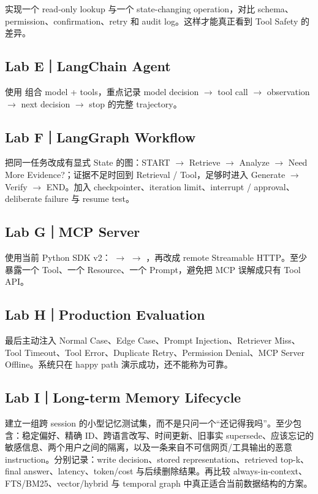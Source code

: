 \documentclass[profile=standard,twoside=false]{ipara-handbook}
\begin{document}
实现一个 read-only lookup 与一个 state-changing operation，对比 schema、permission、confirmation、retry 和 audit log。这样才能真正看到 Tool Safety 的差异。

\subsection{Lab E｜LangChain Agent}

使用  组合 model + tools，重点记录 model decision $\to$ tool call $\to$ observation $\to$ next decision $\to$ stop 的完整 trajectory。

\subsection{Lab F｜LangGraph Workflow}

把同一任务改成有显式 State 的图：START $\to$ Retrieve $\to$ Analyze $\to$ Need More Evidence?；证据不足时回到 Retrieval / Tool，足够时进入 Generate $\to$ Verify $\to$ END。加入 checkpointer、iteration limit、interrupt / approval、deliberate failure 与 resume test。

\subsection{Lab G｜MCP Server}

使用当前 Python SDK v2： $\to$  $\to$ ，再改成 remote Streamable HTTP。至少暴露一个 Tool、一个 Resource、一个 Prompt，避免把 MCP 误解成只有 Tool API。

\subsection{Lab H｜Production Evaluation}

最后主动注入 Normal Case、Edge Case、Prompt Injection、Retriever Miss、Tool Timeout、Tool Error、Duplicate Retry、Permission Denial、MCP Server Offline。系统只在 happy path 演示成功，还不能称为可靠。

\subsection{Lab I｜Long-term Memory Lifecycle}

建立一组跨 session 的小型记忆测试集，而不是只问一个“还记得我吗”。至少包含：稳定偏好、精确 ID、跨语言改写、时间更新、旧事实 supersede、应该忘记的敏感信息、两个用户之间的隔离，以及一条来自不可信网页/工具输出的恶意 instruction。分别记录：write decision、stored representation、retrieved top-k、final answer、latency、token/cost 与后续删除结果。再比较 always-in-context、FTS/BM25、vector/hybrid 与 temporal graph 中真正适合当前数据结构的方案。
\end{document}
